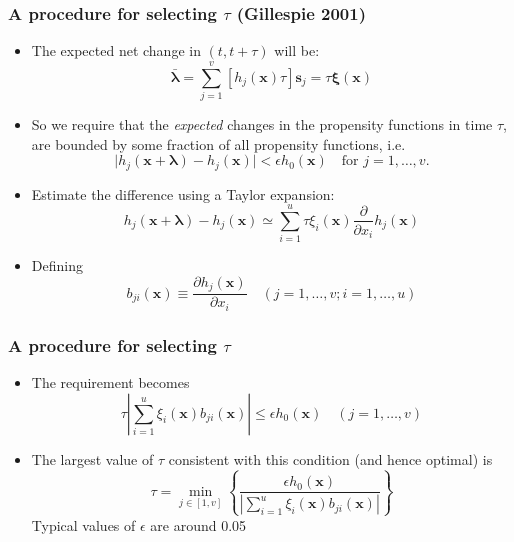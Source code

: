\documentclass[t,compress]{beamer}
\begin{document}
\begin{frame}
\frametitle{A procedure for selecting $\tau$ (Gillespie 2001)}
\begin{itemize}
\item The expected net change in $(t, t+\tau)$ will be:
\[
\bar{\mathbf{\lambda}} = \sum_{j=1}^v [h_j(\mathbf{x}) \tau] \mathbf{s}_j = \tau
\mathbf{\xi(x)}
\]
\item So we require that the \textit{expected} changes in the propensity functions in time
  $\tau$, are bounded by some fraction of all propensity functions, i.e.
\[
\vert  h_j(\mathbf{x} + \mathbf{\lambda} )- h_j(\mathbf{x}) \vert < \epsilon h_0
(\mathbf{x}) \quad \text{for } j=1, \ldots, v.
\]
\item Estimate the difference using a Taylor expansion:
\[
h_j(\mathbf{x} + \mathbf{\lambda} )- h_j(\mathbf{x}) \simeq \sum_{i=1}^u \tau
\xi_i(\mathbf{x}) \frac{\partial}{\partial x_i} h_j(\mathbf{x})
\]
\item Defining
\[
b_{ji}(\mathbf{x}) \equiv \frac{\partial h_j(\mathbf{x})}{\partial x_i} \quad (j=1,
 \ldots, v; i=1, \ldots, u)
\]
\end{itemize}
\end{frame}
\begin{frame}
\frametitle{A procedure for selecting $\tau$}
\begin{itemize}
\item The requirement becomes
 \[
 \tau \left\vert \sum_{i=1}^u \xi_i(\mathbf{x}) b_{ji}(\mathbf{x}) \right \vert
 \le \epsilon h_0(\mathbf{x}) \quad (j=1, \ldots, v)
 \]
\item The largest value of $\tau$ consistent with this condition (and hence
  optimal) is
\[
\tau = \min_{j\in [1, v]} \left\{  \frac{\epsilon h_0(\mathbf{x})}{\left\vert
      \sum_{i=1}^u \xi_i(\mathbf{x}) b_{ji}(\mathbf{x}) \right \vert} \right\}
\]
Typical values of $\epsilon$ are around 0.05
\end{itemize}
\end{frame}
\end{document}
